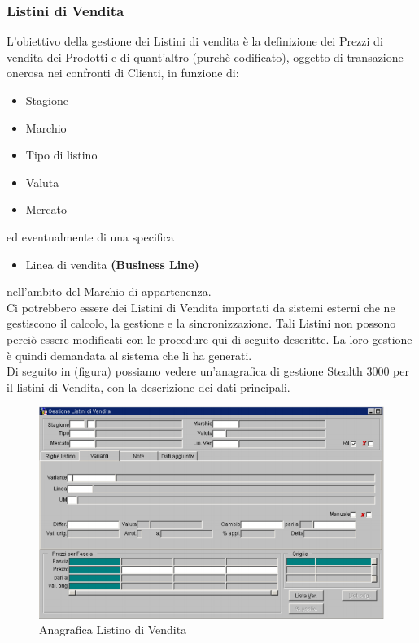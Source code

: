 \subsubsection{Listini di Vendita}
L'obiettivo della gestione dei Listini di vendita è la definizione dei Prezzi di vendita dei Prodotti e di quant’altro (purchè codificato), oggetto di transazione onerosa nei confronti di Clienti, in funzione di:
\begin{itemize}
\item Stagione
\item Marchio
\item Tipo di listino
\item Valuta
\item Mercato
\end{itemize}
ed eventualmente di una specifica
\begin{itemize}
\item Linea di vendita \textbf{(Business Line)}
\end{itemize}
nell’ambito del Marchio di appartenenza.\\
Ci potrebbero essere dei Listini di Vendita importati da sistemi esterni che ne gestiscono il calcolo, la gestione e la sincronizzazione. Tali Listini non possono perciò essere modificati con le procedure qui di seguito descritte. La loro gestione è quindi demandata al sistema che li ha generati.\\
Di seguito in (figura) possiamo vedere un'anagrafica di gestione Stealth 3000 per il listini di Vendita, con la descrizione dei dati principali.\\

\begin{figure}[!h]
\thispagestyle{empty}
\centering
\includegraphics[scale=0.90]{img/Listino.png}
\caption{Anagrafica Listino di Vendita}
\end{figure}
\newpage


